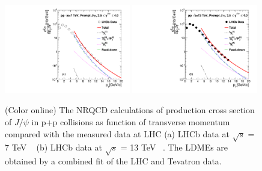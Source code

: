 \documentclass[aps,prc,preprint,superscriptaddress,showpacs,showkeys,amsmath]{revtex4-1}
\begin{document}
\begin{figure}
\includegraphics[width=0.49\textwidth]{Figures/JPsi/LHCb_RootS7TeV_D2NDPtDy_PromptJPsi_Y2035_Pt.pdf}
\includegraphics[width=0.49\textwidth]{Figures/JPsi/LHCb_RootS13TeV_D2NDPtDy_PromptJPsi_Y2045_Pt.pdf}
\caption{(Color online) The NRQCD calculations of production cross section of $J/\psi$ in p+p collisions 
  as function of transverse momentum compared with the measured data at LHC 
  (a) LHCb data at $\sqrt{s}$ = 7 TeV ~\cite{Aaij:2015rla} 
  (b) LHCb data at $\sqrt{s}$ = 13 TeV ~\cite{Aaij:2011jh}. 
  The LDMEs are obtained by a combined fit of the LHC and Tevatron data.
}
\label{Fig:LDMEJPsiLHCb}
\end{figure}



\end{document}
